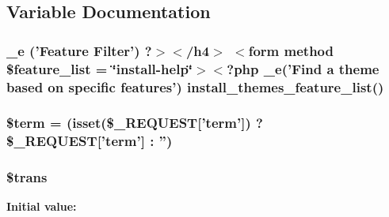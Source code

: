 \subsection{Variable Documentation}
\hypertarget{themes__intro_8php_a9fb473b7531b33269d4897bf53be328b}{
\subsubsection[{\$feature\_\-list}]{\setlength{\rightskip}{0pt plus 5cm}\_\-e ('Feature Filter') ?$>$$<$/h4$>$ $<$form method \$feature\_\-list = \char`\"{}install-\/help\char`\"{}$>$$<$?php \_\-e('Find a theme based on specific features') install\_\-themes\_\-feature\_\-list()}}
\label{d9/dc8/themes__intro_8php_a9fb473b7531b33269d4897bf53be328b}
\hypertarget{themes__intro_8php_aab8e9e6e6b80da234ae2c60691f73262}{
\subsubsection[{\$term}]{\setlength{\rightskip}{0pt plus 5cm}\$term = (isset(\$\_\-REQUEST\mbox{[}'term'\mbox{]}) ? \$\_\-REQUEST\mbox{[}'term'\mbox{]} : '')}}
\label{d9/dc8/themes__intro_8php_aab8e9e6e6b80da234ae2c60691f73262}
\hypertarget{themes__intro_8php_ac75852aae94b46848119a6d7c922cf2e}{
\subsubsection[{\$trans}]{\setlength{\rightskip}{0pt plus 5cm}\$trans}}
\label{d9/dc8/themes__intro_8php_ac75852aae94b46848119a6d7c922cf2e}
{\bfseries Initial value:}
